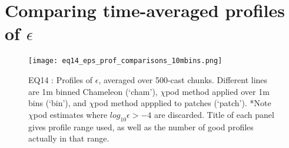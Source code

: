 \documentclass[11pt]{article}
\begin{document}
\clearpage
\section{Comparing time-averaged profiles of $\epsilon$}

%
%
%





\begin{figure}[htbp]
\texttt{[image: eq14\_eps\_prof\_comparisons\_10mbins.png]}
\caption{EQ14 : Profiles of $\epsilon$, averaged over 500-cast chunks. Different lines are 1m binned Chameleon (`cham'), $\chi$pod method applied over 1m bins (`bin'), and $\chi$pod method appplied to patches (`patch'). *Note $\chi$pod estimates where $log_{10}\epsilon>-4$ are discarded. Title of each panel gives profile range used, as well as the number of good profiles actually in that range.}
\label{eps_prof_comp_eq14}
\end{figure}
\end{document}
